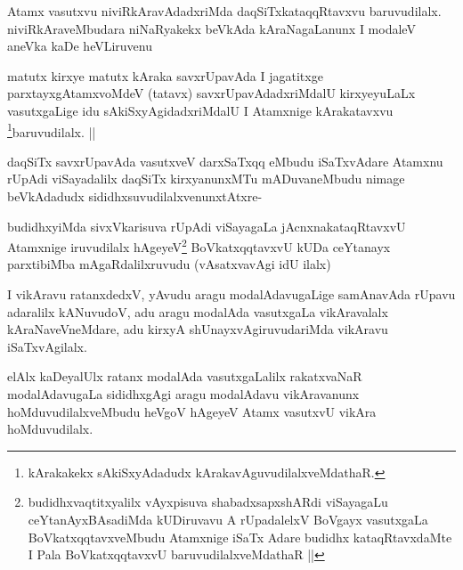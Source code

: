 
\begin{artha}
Atamx vasutxvu niviRkAravAdadxriMda daqSiTxkataqqRtavxvu baruvudilalx. niviRkAraveMbudara niNaRyakekx beVkAda kAraNagaLanunx I modaleV aneVka kaDe heVLiruvenu
\end{artha}

\begin{artha}
matutx kirxye matutx kAraka savxrUpavAda I jagatitxge parxtayxgAtamxvoMdeV (tatavx) savxrUpavAdadxriMdalU kirxyeyuLaLx vasutxgaLige idu sAkiSxyAgidadxriMdalU I Atamxnige kArakatavxvu \footnote{kArakakekx sAkiSxyAdadudx kArakavAguvudilalxveMdathaR.}baruvudilalx. ||
\end{artha}

\begin{artha}
daqSiTx savxrUpavAda vasutxveV darxSaTxqq eMbudu iSaTxvAdare Atamxnu rUpAdi viSayadalilx daqSiTx kirxyanunxMTu mADuvaneMbudu nimage beVkAdadudx sididhxsuvudilalxvenunxtAtxre-
\end{artha}

\begin{artha}
budidhxyiMda sivxVkarisuva rUpAdi viSayagaLa jAcnxnakataqRtavxvU Atamxnige iruvudilalx hAgeyeV\footnote{budidhxvaqtitxyalilx vAyxpisuva shabadxsapxshARdi viSayagaLu ceYtanAyxBAsadiMda kUDiruvavu A rUpadalelxV BoVgayx vasutxgaLa BoVkatxqqtavxveMbudu Atamxnige iSaTx Adare budidhx kataqRtavxdaMte I Pala BoVkatxqqtavxvU baruvudilalxveMdathaR ||} BoVkatxqqtavxvU kUDa ceYtanayx parxtibiMba mAgaRdalilxruvudu (vAsatxvavAgi idU ilalx)
\end{artha}


\begin{artha}
I vikAravu ratanxdedxV, yAvudu aragu modalAdavugaLige samAnavAda rUpavu adaralilx kANuvudoV, adu aragu modalAda vasutxgaLa vikAravalalx kAraNaveVneMdare, adu kirxyA shUnayxvAgiruvudariMda vikAravu iSaTxvAgilalx.
\end{artha}


\begin{artha}
elAlx kaDeyalUlx ratanx modalAda vasutxgaLalilx rakatxvaNaR modalAdavugaLa sididhxgAgi aragu modalAdavu vikAravanunx hoMduvudilalxveMbudu heVgoV hAgeyeV Atamx vasutxvU vikAra hoMduvudilalx.
\end{artha}

